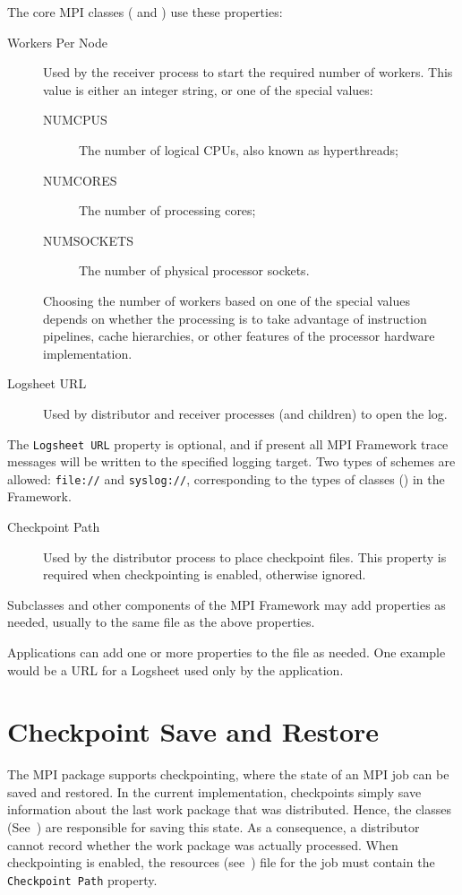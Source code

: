 The core MPI classes ( and ) use these
properties:
\begin{description}
\item[Workers Per Node] Used by the receiver process to start the
required number of workers. This value is either an integer string, or
one of the special values:
\begin{description}
\item[NUMCPUS] The number of logical CPUs, also known as hyperthreads;
\item[NUMCORES] The number of processing cores;
\item[NUMSOCKETS] The number of physical processor sockets.
\end{description}
Choosing the number of workers based on one of the special values depends on
whether the processing is to take advantage of instruction pipelines, cache
hierarchies, or other features of the processor hardware implementation.

\item[Logsheet URL] Used by distributor and receiver processes
(and children) to open the log.
\end{description}
The \verb=Logsheet URL= property is optional, and if present all MPI Framework
trace messages will be written to the specified logging target. Two types of
\URL schemes are allowed: \verb=file://= and \verb=syslog://=, corresponding
to the types of  classes () in the
Framework.

\begin{description}
\item[Checkpoint Path] Used by the distributor process to place checkpoint
files.
This property is required when checkpointing is enabled, otherwise ignored.
\end{description}

Subclasses and other components of the MPI Framework may add properties as
needed, usually to the same file as the above properties.

Applications can add one or more properties to the file as needed. One example
would be a URL for a Logsheet used only by the application.

\section{Checkpoint Save and Restore}
\label{sec-checkpointing}
The MPI package supports checkpointing, where the state of an MPI job can be
saved and restored. In the current implementation, checkpoints simply save
information about the last work package that was distributed. Hence, the
 classes (See~) are
responsible for saving this
state. As a consequence, a distributor cannot record whether the work package
was actually processed. When checkpointing is enabled, the
resources (see~) file for the job must contain the
{\tt Checkpoint Path} property.


